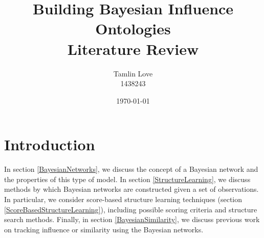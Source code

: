 \documentclass [11pt]{article}
\title{Building Bayesian Influence Ontologies\\Literature Review}
\author{Tamlin Love\\1438243}
\date{\today}
\begin{document}
\maketitle
\section{Introduction}
In section \ref{BayesianNetworks}, we discuss the concept of a Bayesian network and the properties of this type of model. In section \ref{StructureLearning}, we discuss methods by which Bayesian networks are constructed given a set of observations. In particular, we consider score-based structure learning techniques (section \ref{ScoreBasedStructureLearning}), including possible scoring criteria and structure search methods. Finally, in section \ref{BayesianSimilarity}, we discuss previous work on tracking influence or similarity using the Bayesian networks.
\end{document}
